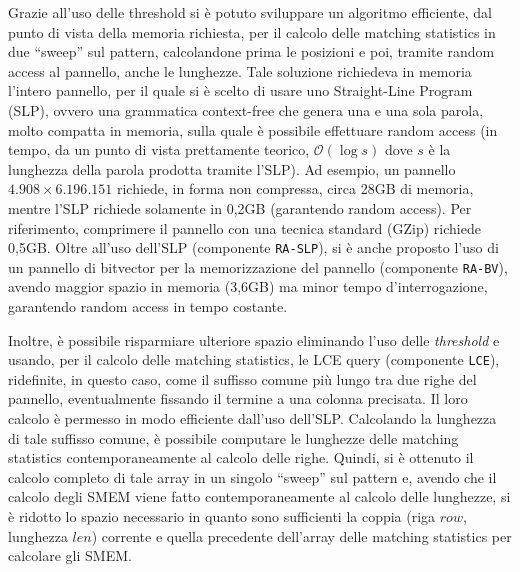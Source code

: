 \documentclass[a4paper,11pt, oneside,italian]{article}
\begin{document}
Grazie all'uso delle threshold si è potuto sviluppare un algoritmo
efficiente, dal punto di vista della memoria richiesta, per il calcolo delle
matching statistics in due ``sweep'' sul pattern, calcolandone prima le
posizioni e poi, tramite random access al pannello, anche le
lunghezze. Tale soluzione richiedeva in memoria l'intero pannello, per il quale
si è scelto di usare uno Straight-Line Program (SLP), ovvero una grammatica
context-free che genera una e una sola parola, molto compatta in memoria, sulla
quale è possibile effettuare random access (in tempo, da un punto di vista
prettamente teorico, $\mathcal{O}(\log s)$ dove
$s$ è la lunghezza della parola prodotta tramite l'SLP).
Ad esempio, un pannello  $4.908 \times 6.196.151$ richiede, in forma non
compressa, circa 28GB di memoria, mentre l'SLP 
richiede 
solamente in 0,2GB (garantendo random access). Per riferimento, comprimere il
pannello con una tecnica 
standard (GZip) richiede 0,5GB. Oltre all'uso dell'SLP (componente
\texttt{RA-SLP}), si è anche proposto l'uso di un pannello di bitvector per la
memorizzazione 
del pannello (componente \texttt{RA-BV}), avendo maggior spazio in memoria (3,6GB) ma
minor tempo d'interrogazione, garantendo random access in tempo costante. 

Inoltre, è possibile risparmiare ulteriore spazio eliminando
l'uso delle \textit{threshold} e usando, per il calcolo delle matching
statistics, le LCE query (componente \texttt{LCE}), 
ridefinite, in questo caso,
come il suffisso comune più lungo tra due righe del pannello, eventualmente
fissando il termine a una colonna precisata. Il loro calcolo è permesso
in modo efficiente dall'uso dell'SLP. Calcolando la
lunghezza di tale suffisso comune, è possibile computare le
lunghezze delle matching statistics contemporaneamente al calcolo delle
righe. Quindi, si è ottenuto il calcolo completo di tale array in
un singolo ``sweep'' sul pattern e, avendo che il calcolo degli SMEM viene fatto
contemporaneamente al calcolo delle lunghezze, si è ridotto lo spazio
necessario in quanto sono sufficienti la 
coppia (riga $row$, lunghezza $len$) corrente e quella precedente dell'array
delle matching statistics per calcolare gli SMEM.
\end{document}
